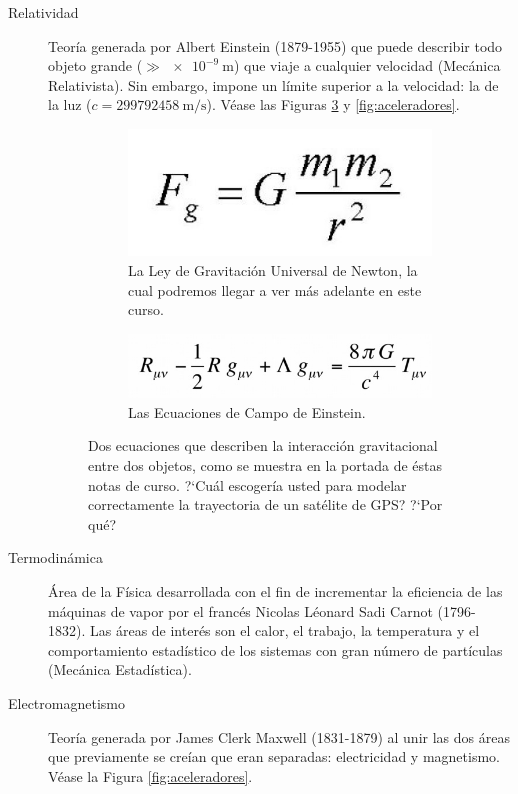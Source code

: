 \begin{description}
    \item [Relatividad] Teor\'ia generada por Albert Einstein (1879-1955) que puede describir todo objeto grande ($\gg\SI{e-9}{\meter}$) que viaje a cualquier velocidad\cite{einstein} (Mec\'anica Relativista). Sin embargo, impone un l\'imite superior a la velocidad: la de la luz ($c=\SI{299792458}{\meter/\second}$). V\'ease las Figuras \ref{fig:newt_v_einst} y  \ref{fig:aceleradores}.
    
\begin{figure}
\centering
\begin{subfigure}{.45\textwidth}
  \centering
  \includegraphics[width=\textwidth]{lecture1/newtongrav.jpg}
  \caption{La Ley de Gravitaci\'on Universal de Newton, la cual podremos llegar a ver m\'as adelante en este curso.}
  \label{fig:sub_newton}
\end{subfigure}%
\hfill
\begin{subfigure}{.45\textwidth}
  \centering
  \includegraphics[width=\textwidth]{lecture1/einsteinfieldeq.jpg}
  \caption{Las Ecuaciones de Campo de Einstein.}
  \label{fig:sub_einstein}
\end{subfigure}
\caption{Dos ecuaciones que describen la interacci\'on gravitacional entre dos objetos, como se muestra en la portada de \'estas notas de curso. ?`Cu\'al escoger\'ia usted para modelar correctamente la trayectoria de un sat\'elite de GPS? ?`Por qu\'e?}
\label{fig:newt_v_einst}
\end{figure}
    
    \item [Termodin\'amica] \'Area de la F\'isica desarrollada con el fin de incrementar la eficiencia de las m\'aquinas de vapor por el franc\'es Nicolas L\'eonard Sadi Carnot (1796-1832). Las \'areas de inter\'es son el calor, el trabajo, la temperatura y el comportamiento estad\'istico de los sistemas con gran n\'umero de part\'iculas (Mec\'anica Estad\'istica).
    \item [Electromagnetismo] Teor\'ia generada por James Clerk Maxwell (1831-1879) al unir las dos \'areas que previamente se cre\'ian que eran separadas: electricidad y magnetismo. V\'ease la Figura \ref{fig:aceleradores}.
    

\end{description}
